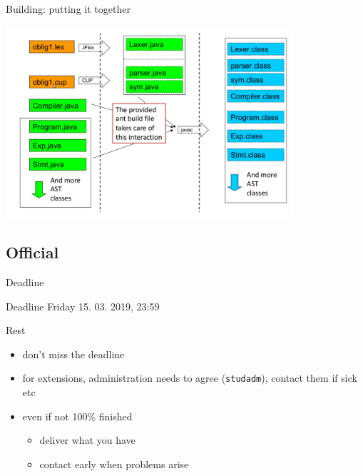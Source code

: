 \documentclass{beamer}
\begin{document}
\begin{frame}[label={sec:org0197927}]{Building: putting it together}

\begin{center}
 \includegraphics[width=0.8\textwidth]{figures/snaps/buildprocess}
\end{center}
\end{frame}

\subsection{Official}
\label{sec:org20a01d5}

\begin{frame}[label={sec:org921298e},fragile]{Deadline}
 \begin{alertblock}{Deadline}
\alert{Friday 15. 03. 2019, 23:59}
\end{alertblock}


\begin{block}{Rest}
\begin{itemize}
\item don't miss the deadline
\item for extensions, administration needs to agree (\texttt{studadm}), contact them
if sick etc
\item even if not 100\% finished
\begin{itemize}
\item deliver what you have
\item contact early when problems arise
\end{itemize}
\end{itemize}
\end{block}
\end{frame}
\end{document}
